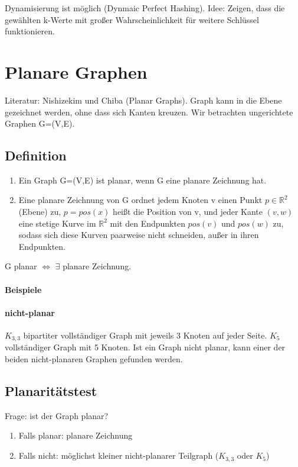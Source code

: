 Dynamisierung ist möglich (Dynmaic Perfect Hashing). Idee: Zeigen, dass die gewählten k-Werte mit großer Wahrscheinlichkeit für weitere Schlüssel funktionieren.


\section{Planare Graphen}
Literatur: Nishizekim und Chiba (Planar Graphs). Graph kann in die Ebene gezeichnet werden, ohne dass sich Kanten kreuzen. Wir betrachten ungerichtete Graphen G=(V,E).
\subsection{Definition}
\begin{enumerate}
    \item Ein Graph G=(V,E) ist planar, wenn G eine planare Zeichnung hat.
    \item Eine planare Zeichnung von G ordnet jedem Knoten v einen Punkt $ p \in \mathbb{R}^2 $ (Ebene) zu, $ p = pos(x) $ heißt die Position von v, und jeder Kante $ (v,w) $ eine stetige Kurve im $ \mathbb{R}^2 $ mit den Endpunkten $ pos(v) $ und $ pos(w) $ zu, sodass sich diese Kurven paarweise nicht schneiden, außer in ihren Endpunkten. 
\end{enumerate}
G planar $ \Leftrightarrow $ $ \exists $ planare Zeichnung.
\paragraph{Beispiele}

\paragraph{nicht-planar} $ K_{3,3} $ bipartiter vollständiger Graph mit jeweils 3 Knoten auf jeder Seite. $ K_5 $ vollständiger Graph mit 5 Knoten. Ist ein Graph nicht planar, kann einer der beiden nicht-planaren Graphen gefunden werden.

\subsection{Planaritätstest}
Frage: ist der Graph planar?
\begin{enumerate}
    \item Falls planar: planare Zeichnung
    \item Falls nicht: möglichst kleiner nicht-planarer Teilgraph ($ K_{3,3} $ oder $ K_5 $)
\end{enumerate}

